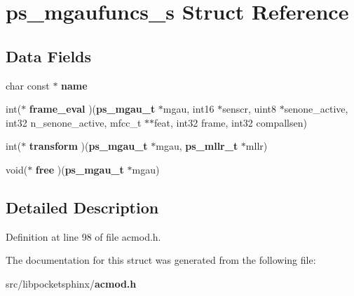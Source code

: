 \section{ps\+\_\+mgaufuncs\+\_\+s Struct Reference}
\label{structps__mgaufuncs__s}
\subsection*{Data Fields}
\begin{DoxyCompactItemize}
\item 
char const $\ast$ {\bfseries name}\label{structps__mgaufuncs__s_a5f3570efd5d8a41003b9628663e66b4c}

\item 
int($\ast$ {\bfseries frame\+\_\+eval} )({\bf ps\+\_\+mgau\+\_\+t} $\ast$mgau, int16 $\ast$senscr, uint8 $\ast$senone\+\_\+active, int32 n\+\_\+senone\+\_\+active, mfcc\+\_\+t $\ast$$\ast$feat, int32 frame, int32 compallsen)\label{structps__mgaufuncs__s_a3176f3e6fb82c673ef54f63b76a3fca9}

\item 
int($\ast$ {\bfseries transform} )({\bf ps\+\_\+mgau\+\_\+t} $\ast$mgau, {\bf ps\+\_\+mllr\+\_\+t} $\ast$mllr)\label{structps__mgaufuncs__s_a02df073c4e7dc562b5dcd3ac2bb07eb8}

\item 
void($\ast$ {\bfseries free} )({\bf ps\+\_\+mgau\+\_\+t} $\ast$mgau)\label{structps__mgaufuncs__s_a38dad1a9d594cf9a239de75f6c2e8d98}

\end{DoxyCompactItemize}


\subsection{Detailed Description}


Definition at line 98 of file acmod.\+h.



The documentation for this struct was generated from the following file\+:\begin{DoxyCompactItemize}
\item 
src/libpocketsphinx/{\bf acmod.\+h}\end{DoxyCompactItemize}
